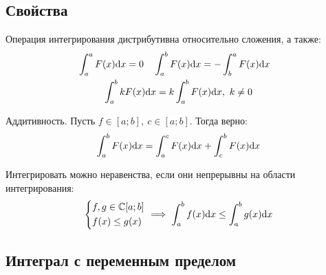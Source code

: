 \subsection{Свойства}

Операция интегрирования {\ital дистрибутивна} относительно {\ital сложения}, а также:
\begin{gather*}
\begin{aligned}
&\int_a^aF(x)\text{d} x=0 & &\int_a^bF(x)\text{d} x=-\int_b^aF(x)\text{d} x
\end{aligned}\\
\int_a^b kF(x)\text{d} x=k\int_a^b F(x)\text{d} x,\ k\neq 0
\end{gather*}
\begin{theorem}
{\bold Аддитивность.} Пусть $f\in[a;b],\ c\in[a;b]$. Тогда верно:
$$\int_a^bF(x)\text{d} x=\int_a^cF(x)\text{d} x+\int_c^bF(x)\text{d} x$$
\end{theorem}
Интегрировать можно {\ital неравенства}, если они непрерывны на области интегрирования:
$$\left\{\begin{aligned}
&f,g\in\mathbb{C}[a;b]\\
&f(x)\leq g(x)
\end{aligned}\right.\implies
\int_a^bf(x)\text{d} x\leq\int_a^bg(x)\text{d} x$$

\subsection{Интеграл с переменным пределом}

